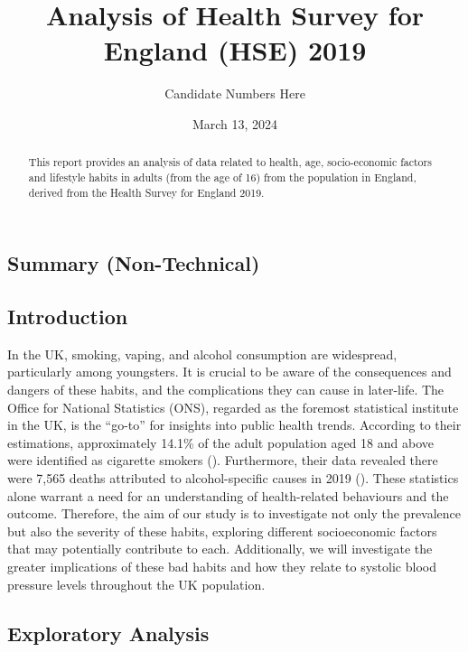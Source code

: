 \documentclass[
  11pt,
]{article}
\title{Analysis of Health Survey for England (HSE) 2019}
\author{Candidate Numbers Here}
\date{March 13, 2024}
\begin{document}
\maketitle
\begin{abstract}
This report provides an analysis of data related to health, age,
socio-economic factors and lifestyle habits in adults (from the age of
16) from the population in England, derived from the Health Survey for
England 2019.
\end{abstract}


\newpage

\subsection{Summary (Non-Technical)}\label{summary-non-technical}

\subsection{Introduction}\label{introduction}

In the UK, smoking, vaping, and alcohol consumption are widespread,
particularly among youngsters. It is crucial to be aware of the
consequences and dangers of these habits, and the complications they can
cause in later-life. The Office for National Statistics (ONS), regarded
as the foremost statistical institute in the UK, is the ``go-to'' for
insights into public health trends. According to their estimations,
approximately 14.1\% of the adult population aged 18 and above were
identified as cigarette smokers ().
Furthermore, their data revealed there were 7,565 deaths attributed to
alcohol-specific causes in 2019 (). These
statistics alone warrant a need for an understanding of health-related
behaviours and the outcome. Therefore, the aim of our study is to
investigate not only the prevalence but also the severity of these
habits, exploring different socioeconomic factors that may potentially
contribute to each. Additionally, we will investigate the greater
implications of these bad habits and how they relate to systolic blood
pressure levels throughout the UK population.

\subsection{Exploratory Analysis}\label{exploratory-analysis}
\end{document}
